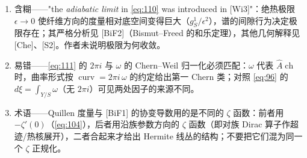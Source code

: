 \documentclass[11pt]{amsart}
\theoremstyle{definition}
\theoremstyle{remark}
\theoremstyle{plain}
\numberwithin{equation}{section}
\renewcommand{\:}{\colon}
\newcommand{\Ahat}{{\hat A}}
\DeclareMathOperator{\ch}{ch}
\newcommand{\cir}{S^1}
\DeclareMathOperator{\curv}{curv}
\begin{document}
\begin{enumerate}[leftmargin=2.2em,itemsep=2pt,topsep=2pt]
  \item 含糊——"the \emph{adiabatic limit} in \eqref{eq:110} was introduced in [Wi3]"：绝热极限 $\epsilon\to0$ 使纤维方向的度量相对底空间变得巨大（$g_\cir/\epsilon^2$），谱的间隙行为决定极限存在；其严格分析见 [BiF2]（Bismut–Freed 的和乐定理），其他几何解释见 [Che]、[S2]。作者未说明极限为何收敛。
  \item 易错——\eqref{eq:111} 的 $2\pi i$ 与 $\omega$ 的 Chern–Weil 归一化必须匹配：$\omega$ 代表 $\Ahat\ch$ 时，曲率形式按 $\curv = 2\pi i\,\omega$ 的约定给出第一 Chern 类；对照 \eqref{eq:96} 的 $d\xi=\int_{Y/S}\omega$（无 $2\pi i$）可见两处因子的来源不同。
  \item 术语——Quillen 度量与 [BiF1] 的协变导数用的是不同的 $\zeta$ 函数：前者用 $-\zeta'(0)$（\eqref{eq:104}），后者用沿族参数方向的 $\zeta$ 函数（即对族 Dirac 算子作超迹/热核展开），二者合起来才给出 Hermite 线丛的结构；不要把它们混为同一个 $\zeta$ 正规化。
\end{enumerate}
\end{document}

